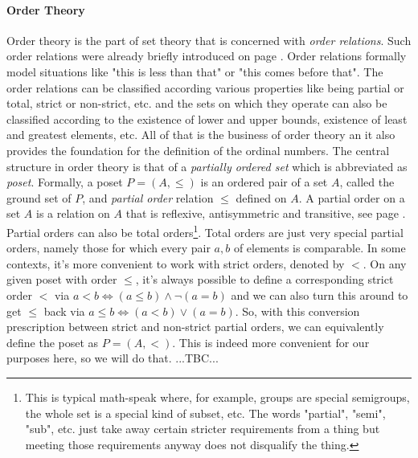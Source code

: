 \paragraph{Order Theory} Order theory is the part of set theory that is concerned with \emph{order relations}. Such order relations were already briefly introduced on page \pageref{Par:Orders}. Order relations formally model situations like "this is less than that" or "this comes before that". The order relations can be classified according various properties like being partial or total, strict or non-strict, etc. and the sets on which they operate can also be classified according to the existence of lower and upper bounds, existence of least and greatest elements, etc. All of that is the business of order theory an it also provides the foundation for the definition of the ordinal numbers. The central structure in order theory is that of a \emph{partially ordered set} which is abbreviated as \emph{poset}. Formally, a poset $P = (A, \leq)$ is an ordered pair of a set $A$, called the ground set of $P$, and \emph{partial order} relation $\leq$ defined on $A$. A partial order on a set $A$ is a relation on $A$ that is reflexive, antisymmetric and transitive, see page \pageref{Tab:RelationFeatures}. Partial orders can also be total orders\footnote{This is typical math-speak where, for example, groups are special semigroups, the whole set is a special kind of subset, etc. The words "partial", "semi", "sub", etc. just take away certain stricter requirements from a thing but meeting those requirements anyway does not disqualify the thing.}. Total orders are just very special partial orders, namely those for which every pair $a,b$ of elements is comparable. In some contexts, it's more convenient to work with strict orders, denoted by $<$. On any given poset with order $\leq$, it's always possible to define a corresponding strict order $<$ via $a < b \Leftrightarrow (a \leq b) \wedge \neg (a = b)$ and we can also turn this around to get $\leq$ back via $a \leq b \Leftrightarrow (a < b) \vee (a = b)$. So, with this conversion prescription between strict and non-strict partial orders, we can equivalently define the poset as $P = (A, <)$. This is indeed more convenient for our purposes here, so we will do that. ...TBC...



